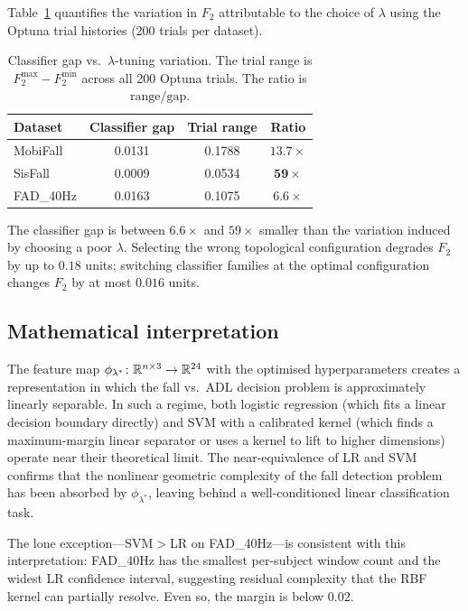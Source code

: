 Table~\ref{tab:H3-comparison} quantifies the variation in $F_2$ attributable to the
choice of $\lambda$ using the Optuna trial histories (200 trials per dataset).

\begin{table}[h!]
\centering
\caption{Classifier gap vs.\ $\lambda$-tuning variation.  The trial range is
  $F_2^{\max} - F_2^{\min}$ across all 200 Optuna trials.  The ratio is
  $\text{range}/\text{gap}$.}
\label{tab:H3-comparison}
\small
\begin{tabular}{lccc}
\toprule
\textbf{Dataset} & \textbf{Classifier gap} & \textbf{Trial range} & \textbf{Ratio} \\
\midrule
MobiFall  & 0.0131 & 0.1788 & $\mathbf{13.7\times}$ \\
SisFall   & 0.0009 & 0.0534 & $\mathbf{59\times}$   \\
FAD\_40Hz & 0.0163 & 0.1075 & $\mathbf{6.6\times}$  \\
\bottomrule
\end{tabular}
\end{table}

The classifier gap is between $6.6\times$ and $59\times$ smaller than the variation
induced by choosing a poor $\lambda$.  Selecting the wrong topological configuration
degrades $F_2$ by up to $0.18$ units; switching classifier families at the optimal
configuration changes $F_2$ by at most $0.016$ units.

\subsection{Mathematical interpretation}

The feature map $\phi_{\lambda^*}\colon\mathbb{R}^{n\times 3}\to\mathbb{R}^{24}$ with the optimised
hyperparameters creates a representation in which the fall vs.\ ADL decision problem
is approximately linearly separable.  In such a regime, both logistic regression (which
fits a linear decision boundary directly) and SVM with a calibrated kernel (which finds
a maximum-margin linear separator or uses a kernel to lift to higher dimensions) operate
near their theoretical limit.  The near-equivalence of LR and SVM confirms that the
nonlinear geometric complexity of the fall detection problem has been absorbed by
$\phi_{\lambda^*}$, leaving behind a well-conditioned linear classification task.

The lone exception---SVM$>$LR on FAD\_40Hz---is consistent with this interpretation:
FAD\_40Hz has the smallest per-subject window count and the widest LR confidence
interval, suggesting residual complexity that the RBF kernel can partially resolve.
Even so, the margin is below $0.02$.

